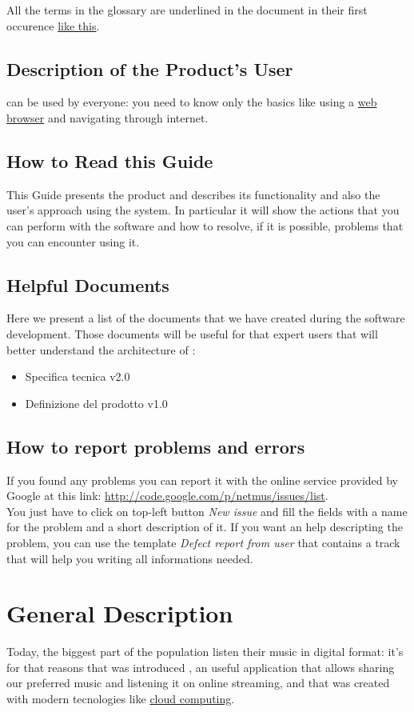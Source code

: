 All the terms in the glossary are underlined in the document in their first
occurence \underline{like this}.

\section{Description of the Product's User}
 can be used by everyone: you need to know only the basics like using
a \underline{web browser} and navigating through internet. 


\section{How to Read this Guide}
This Guide presents the product  and describes its functionality and
also the user's approach using the system. In particular it will show the 
actions that you can perform with the software and how to resolve, if it is
possible, problems that you can encounter using it.

\section{Helpful Documents}
Here we present a list of the documents that we have created during the
software development. Those documents will be useful for that expert users that
 will better understand the architecture of :
\begin{itemize}
  \item Specifica tecnica v2.0
  \item Definizione del prodotto v1.0
\end{itemize}

\section{How to report problems and errors}
If you found any problems you can report it with the online service provided by
Google at this link:  \url{http://code.google.com/p/netmus/issues/list}.\\
You just have to click on top-left button \emph{New issue} and fill the
fields with a name for the problem and a short description of it.
If you want an help descripting the problem, you can use the template
\emph{Defect report from user} that contains a track that will help you writing all 
informations needed. 

\chapter{General Description}
\thispagestyle{fancy}
Today, the biggest part of the population listen their music in digital
format: it's for that reasons that was introduced , an useful
application that allows sharing our preferred music and listening it on online
streaming, and that was created with modern tecnologies like \underline{cloud
computing}.\\


